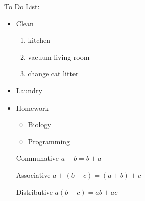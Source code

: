 \documentclass[12pt]{article}
\begin{document}
To Do List:

\begin{itemize}
\item Clean
	\begin{enumerate}
	\item kitchen
	\item vacuum living room
	\item change cat litter
	\end{enumerate}
\item Laundry
\item Homework
	\begin{itemize}
	\item Biology
	\item Programming
	\end{itemize}
\end{itemize}


\begin{enumerate}
\item[Communative] $a+b=b+a$
\item[Associative] $a+(b+c)=(a+b)+c$
\item[Distributive] $a(b+c)=ab+ac$
\end{enumerate}
\end{document}
